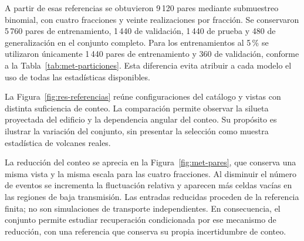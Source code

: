 A partir de esas referencias se obtuvieron 9\,120 pares mediante submuestreo binomial, con cuatro fracciones y veinte realizaciones por fracción. Se conservaron 5\,760 pares de entrenamiento, 1\,440 de validación, 1\,440 de prueba y 480 de generalización en el conjunto completo. Para los entrenamientos al 5\,\% se utilizaron únicamente 1\,440 pares de entrenamiento y 360 de validación, conforme a la Tabla~\ref{tab:met-particiones}. Esta diferencia evita atribuir a cada modelo el uso de todas las estadísticas disponibles.

La Figura~\ref{fig:res-referencias} reúne configuraciones del catálogo y vistas con distinta suficiencia de conteo. La comparación permite observar la silueta proyectada del edificio y la dependencia angular del conteo. Su propósito es ilustrar la variación del conjunto, sin presentar la selección como muestra estadística de volcanes reales.

La reducción del conteo se aprecia en la Figura~\ref{fig:met-pares}, que conserva una misma vista y la misma escala para las cuatro fracciones. Al disminuir el número de eventos se incrementa la fluctuación relativa y aparecen más celdas vacías en las regiones de baja transmisión. Las entradas reducidas proceden de la referencia finita; no son simulaciones de transporte independientes. En consecuencia, el conjunto permite estudiar recuperación condicionada por ese mecanismo de reducción, con una referencia que conserva su propia incertidumbre de conteo.

